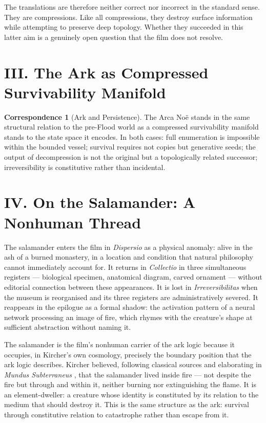 \documentclass[12pt, a4paper, twoside]{memoir}
\theoremstyle{definition}
\newtheorem{correspondence}{Correspondence}[chapter]
\theoremstyle{remark}
\begin{document}
The translations are therefore neither correct nor incorrect in the standard sense. They are compressions. Like all compressions, they destroy surface information while attempting to preserve deep topology. Whether they succeeded in this latter aim is a genuinely open question that the film does not resolve.

\section*{III. The Ark as Compressed Survivability Manifold}

\begin{correspondence}[Ark and Persistence]
The Arca No\"e stands in the same structural relation to the pre-Flood world as a compressed survivability manifold stands to the state space it encodes. In both cases: full enumeration is impossible within the bounded vessel; survival requires not copies but generative seeds; the output of decompression is not the original but a topologically related successor; irreversibility is constitutive rather than incidental.
\end{correspondence}

\section*{IV. On the Salamander: A Nonhuman Thread}

The salamander enters the film in \textit{Dispersio} as a physical anomaly: alive in the ash of a burned monastery, in a location and condition that natural philosophy cannot immediately account for. It returns in \textit{Collectio} in three simultaneous registers --- biological specimen, anatomical diagram, carved ornament --- without editorial connection between these appearances. It is lost in \textit{Irreversibilitas} when the museum is reorganised and its three registers are administratively severed. It reappears in the epilogue as a formal shadow: the activation pattern of a neural network processing an image of fire, which rhymes with the creature's shape at sufficient abstraction without naming it.

The salamander is the film's nonhuman carrier of the ark logic because it occupies, in Kircher's own cosmology, precisely the boundary position that the ark logic describes. Kircher believed, following classical sources and elaborating in \textit{Mundus Subterraneus} \cite{kircher1665}, that the salamander lived inside fire --- not despite the fire but through and within it, neither burning nor extinguishing the flame. It is an element-dweller: a creature whose identity is constituted by its relation to the medium that should destroy it. This is the same structure as the ark: survival through constitutive relation to catastrophe rather than escape from it.
\end{document}
